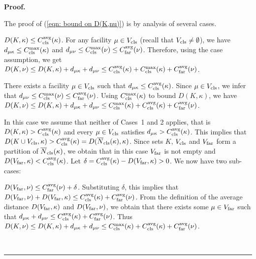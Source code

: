\documentclass[oneside,final]{ucr}
\newenvironment{proof}[1][Proof]{\textbf{#1.} }{\ \rule{0.5em}{0.5em}}
\begin{document}
\begin{proof}
\medskip

The proof of (\ref{eqn: bound on D(K,nu)}) is by analysis of several cases.
%

\medskip
\noindent
{} $D(K, \kappa) \leq \clsdist(\kappa)$. For any
facility $\mu \in V_{\cls}$ (recall that $V_{\cls}\neq\emptyset$), 
we have $d_{\mu\kappa} \leq \clsmax(\kappa)$ 
and $d_{\mu\nu} \leq \clsmax(\nu) \leq \fardist(\nu)$. Therefore, using the
case assumption, we get
	$D(K,\nu) \leq D(K,\kappa) + d_{\mu\kappa} + d_{\mu\nu} 
				\leq \clsdist(\kappa) + \clsmax(\kappa) + \fardist(\nu)$.

\medskip
\noindent
{} There exists a facility $\mu\in V_{\cls}$ such that
  $d_{\mu\kappa} \leq \clsdist(\kappa)$. Since $\mu\in V_{\cls}$, we infer
  that $d_{\mu\nu} \leq \clsmax(\nu) \leq \fardist(\nu)$.  Using
  $\clsmax(\kappa)$ to bound $D(K, \kappa)$, we have $D(K, \nu)
  \leq D(K, \kappa) + d_{\mu\kappa} + d_{\mu\nu} \leq
  \clsmax(\kappa) + \clsdist(\kappa) + \fardist(\nu)$.

\medskip
\noindent
{} In this case we assume that neither of Cases~1 and 2 applies, that is
 $D(K, \kappa) > \clsdist(\kappa)$ and every $\mu \in V_{\cls}$ satisfies
 $d_{\mu\kappa} >  \clsdist(\kappa)$. This implies that
$D(K\cup V_{\cls}, \kappa) > \clsdist(\kappa) = D(\wbarclsnb(\kappa), \kappa)$.
Since sets $K$, $V_{\cls}$ and $V_{\far}$ form a partition of $\wbarclsnb(\kappa)$,
we obtain that in this case $V_{\far}$ is not
empty and $D(V_{\far}, \kappa) < \clsdist(\kappa)$. 
Let $\delta = \clsdist(\kappa) - D(V_{\far}, \kappa) > 0$. 
We now have two sub-cases:
%
\begin{description}
	
\item{} {$D(V_{\far}, \nu) \leq \fardist(\nu) + \delta$}.
  Substituting $\delta$, this implies that $D(V_{\far}, \nu) +
  D(V_{\far},\kappa) \le \clsdist(\kappa) + \fardist(\nu)$.  From the
  definition of the average distance $D(V_{\far},\kappa)$ and
  $D(V_{\far}, \nu)$, we obtain that there exists some $\mu \in
  V_{\far}$ such that $d_{\mu\kappa} + d_{\mu\nu} \leq
  \clsdist(\kappa) + \fardist(\nu)$.  Thus $D(K, \nu) \leq D(K,
  \kappa) + d_{\mu\kappa} + d_{\mu\nu} \leq \clsmax(\kappa) +
  \clsdist(\kappa) + \fardist(\nu)$.


\end{description}
\end{proof}
\end{document}
